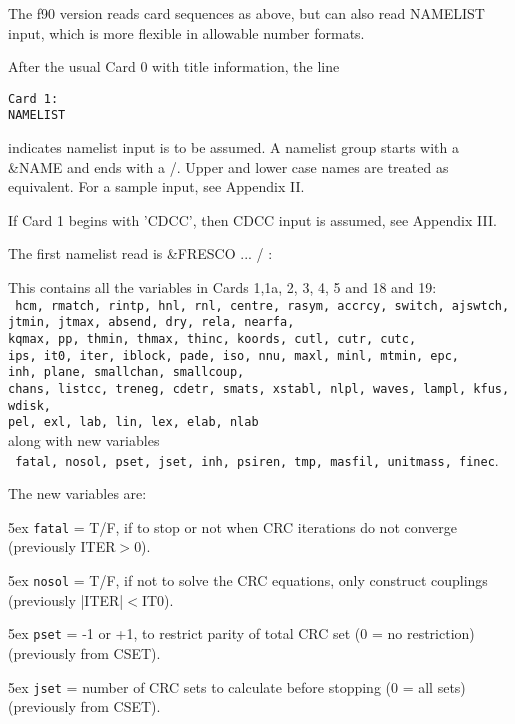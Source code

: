 \documentclass[11pt]{article}
\begin{document}
\bigskip
The f90 version reads card sequences as above, but can also read NAMELIST
input, which is more flexible in allowable number formats.

After the usual Card 0 with title information, the line
\begin{verbatim}
Card 1:
NAMELIST
\end{verbatim}
indicates namelist input is to be assumed.
A namelist group starts with a \&NAME and ends with a /. Upper and lower
case names are treated as equivalent. For a sample input, see Appendix II.

If Card 1 begins with 'CDCC', then CDCC input is assumed, see Appendix III.

\bigskip
The first namelist read is \&FRESCO ... / :


This contains all the variables in Cards 1,1a, 2, 3, 4, 5 and  18 and 19:\\
{\tt
hcm, rmatch, rintp, hnl, rnl, centre, rasym, accrcy, switch, ajswtch,  \\
jtmin, jtmax, absend, dry, rela, nearfa, \\
kqmax, pp, thmin, thmax, thinc, koords, cutl, cutr, cutc, \\
ips, it0, iter, iblock, pade, iso, nnu, maxl, minl, mtmin, epc,  \\
inh, plane, smallchan, smallcoup, \\
chans, listcc, treneg, cdetr, smats, xstabl, nlpl, waves,  lampl, kfus, wdisk, \\
pel, exl, lab, lin, lex, elab, nlab
}\\
along with new variables \\
{\tt
fatal, nosol, pset, jset, inh, psiren, tmp, masfil, unitmass, finec}.

The new variables are:


\hangindent 5ex
{\tt fatal} = T/F, if to stop or not when CRC iterations do not converge
        (previously ITER$>$0).

\hangindent 5ex
{\tt nosol} = T/F, if not to solve the CRC equations, only construct couplings
        (previously |ITER|$<$IT0).

\hangindent 5ex
{\tt pset} = -1 or +1, to restrict parity of total CRC set (0 = no restriction)
        (previously from CSET).

\hangindent 5ex
{\tt jset} = number of CRC sets to calculate before stopping (0 = all sets)
        (previously from CSET).
\end{document}
